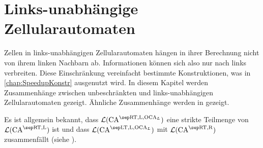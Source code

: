 \chapter{Links-unabhängige Zellularautomaten}
\label{chap:LinksunabhAuto}

Zellen in links-unabhängigen Zellularautomaten hängen in ihrer Berechnung nicht von ihrem linken Nachbarn ab.
Informationen können sich also nur nach links verbreiten. Diese Einschränkung vereinfacht bestimmte Konstruktionen, was in \cref{chap:SpeedupKonstr} ausgenutzt wird.
In diesem Kapitel werden Zusammenhänge zwischen unbeschränkten und links-unabhängigen Zellularautomaten gezeigt.
Ähnliche Zusammenhänge werden in \cite{Choffrut1984} gezeigt.

Es ist allgemein bekannt,
dass $\CAL{\CART, \CALeft, \LOCA}$ eine strikte Teilmenge von $\CAL{\CART, \CALeft}$ ist und
dass $\CAL{\CALT, \CALeft, \LOCA}$ mit $\CAL{\CART, \CARight}$ zusammenfällt (siehe \cite{Kutrib2009}).

